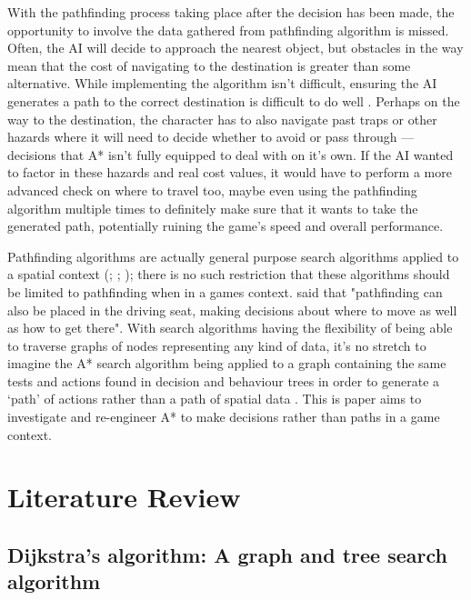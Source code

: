 \documentclass[11pt, a4paper]{report}
\begin{document}
With the pathfinding process taking place after the decision has been made, the opportunity to involve the data gathered from pathfinding algorithm is missed. Often, the AI will decide to approach the nearest object, but obstacles in the way mean that the cost of navigating to the destination is greater than some alternative. While implementing the algorithm isn't difficult, ensuring the AI generates a path to the correct destination is difficult to do well \parencite{forbus2002qualitative}. Perhaps on the way to the destination, the character has to also navigate past traps or other hazards where it will need to decide whether to avoid or pass through --- decisions that A* isn't fully equipped to deal with on it's own. If the AI wanted to factor in these hazards and real cost values, it would have to perform a more advanced check on where to travel too, maybe even using the pathfinding algorithm multiple times to definitely make sure that it wants to take the generated path, potentially ruining the game's speed and overall performance.

Pathfinding algorithms are actually general purpose search algorithms applied to a spatial context (\cite[125]{cui2011based}; \cite[6]{orkin2003applying}; \cite[46]{yap2002grid}); there is no such restriction that these algorithms should be limited to pathfinding when in a games context. \citeauthor{millington2019ai} \parencite*[197]{millington2019ai} said that "pathfinding can also be placed in the driving seat, making decisions about where to move as well as how to get there". With search algorithms having the flexibility of being able to traverse graphs of nodes representing any kind of data, it's no stretch to imagine the A* search algorithm being applied to a graph containing the same tests and actions found in decision and behaviour trees in order to generate a `path' of actions rather than a path of spatial data \parencite[114]{higgins2002generic}. This is paper aims to investigate and re-engineer A* to make decisions rather than paths in a game context.

\section{Literature Review}
\label{sec:literatureReview}

\subsection{Dijkstra's algorithm: A graph and tree search algorithm}
\label{subsec:dijkstrasAlgorithm}
\end{document}
